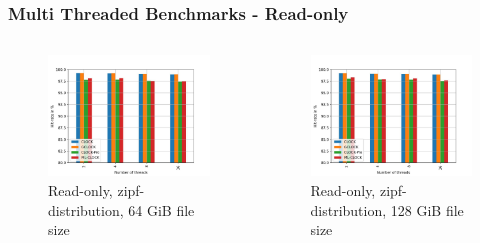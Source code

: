 \documentclass[
	aspectratio=169,
	compress,
]{beamer}
\newcommand{\navframetitle}[1]{\frametitle{#1\hfill{\footnotesize\lastsection{}}}}
\begin{document}
\begin{frame}[fragile]
	\navframetitle{Multi Threaded Benchmarks - Read-only}

	\begin{columns}
		\begin{column}{0.5\textwidth}
			\begin{figure}[ht]
    			\centering
    			\includegraphics[width=\textwidth]{multi_64_gb_randread_zipf.jpg}
        		\caption{Read-only, zipf-distribution, 64 GiB file size}
			\end{figure}
		\end{column}
		\begin{column}{0.5\textwidth}
			\begin{figure}[ht]
    			\centering
    			\includegraphics[width=\textwidth]{multi_128_gb_randread_zipf.jpg}
        		\caption{Read-only, zipf-distribution, 128 GiB file size}
			\end{figure}			
		\end{column}
	\end{columns}
\end{frame}
\end{document}
